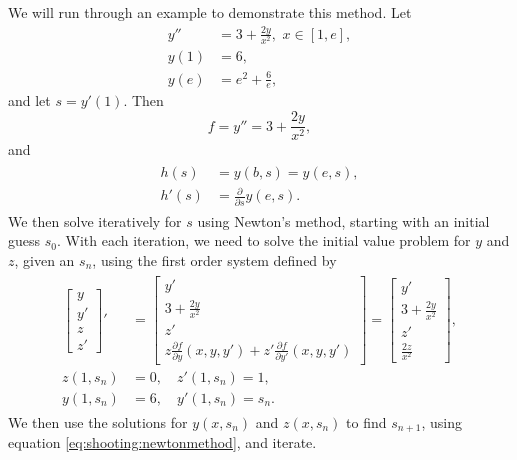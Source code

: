 We will run through an example to demonstrate this method. Let
\begin{equation*}
\begin{split}
y'' &= 3 + \frac{2y}{x^2}, \,\, x \in [1,e],\\
y(1) &= 6, \\
y(e) &= e^2 + \frac{6}{e},
\end{split}
\end{equation*}
and let $s=y'(1)$. Then
\begin{equation*}
f = y'' = 3 + \frac{2y}{x^2},
\end{equation*}
and
\begin{align*}
\begin{split}
h(s) &= y(b,s) = y(e,s),
\\
h'(s) &= \frac{\partial}{\partial s} y(e,s).
\end{split}
\end{align*}
We then solve iteratively for $s$ using Newton's method, starting with an initial guess $s_0$. With each iteration, we need to solve the initial value problem for $y$ and $z$, given an $s_n$, using the first order system defined by
\begin{align*}
\begin{split}
\begin{bmatrix}y\\y'\\z\\z'\end{bmatrix}'
&= \begin{bmatrix}y'\\3 + \frac{2y}{x^2}
\\z'\\z\frac{\partial f}{\partial y} (x,y,y') + z' \frac{\partial f}{\partial y'} (x,y,y')\end{bmatrix}
= \begin{bmatrix}y'\\3 + \frac{2y}{x^2}
\\z'\\ \frac{2z}{x^2}\end{bmatrix},
\\
z(1,s_n) &= 0, \quad z'(1,s_n) = 1,
\\
y(1,s_n) &= 6, \quad y'(1,s_n) = s_n.
\end{split}
\end{align*}
We then use the solutions for $y(x,s_n)$ and $z(x,s_n)$ to find $s_{n+1}$, using equation \eqref{eq:shooting:newtonmethod}, and iterate.


